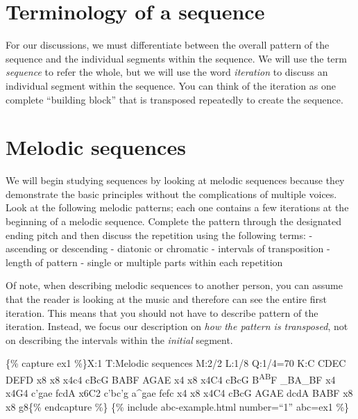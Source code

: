 \documentclass{book}
\begin{document}
\hypertarget{terminology-of-a-sequence}{%
\section{Terminology of a sequence}\label{terminology-of-a-sequence}}

For our discussions, we must differentiate between the overall pattern of the
sequence and the individual segments within the sequence. We will use the term
\emph{sequence} to refer the whole, but we will use the word \emph{iteration}
to discuss an individual segment within the sequence. You can think of the
iteration as one complete ``building block'' that is transposed repeatedly to
create the sequence.

\hypertarget{melodic-sequences}{%
\section{Melodic sequences}\label{melodic-sequences}}

We will begin studying sequences by looking at melodic sequences because they
demonstrate the basic principles without the complications of multiple voices.
Look at the following melodic patterns; each one contains a few iterations at
the beginning of a melodic sequence. Complete the pattern through the
designated ending pitch and then discuss the repetition using the following
terms: - ascending or descending - diatonic or chromatic - intervals of
transposition - length of pattern - single or multiple parts within each
repetition

Of note, when describing melodic sequences to another person, you can assume
that the reader is looking at the music and therefore can see the entire first
iteration. This means that you should not have to describe pattern of the
iteration. Instead, we focus our description on \emph{how the pattern is
transposed}, not on describing the intervals within the \emph{initial}
segment.

\{\% capture ex1 \%\}X:1 T:Melodic sequences M:2/2 L:1/8 Q:1/4=70 K:C CDEC
DEFD\textbar{} x8\textbar{} x8\textbar{} x4c4\textbar\textbar{} cBcG
BABF\textbar{} AGAE x4\textbar{} x8\textbar{} x4C4\textbar\textbar{} cBcG
B\textsuperscript{AB}F\textbar{} \_BA\_BF x4\textbar{} x4G4\textbar\textbar{}
c'gae fcdA\textbar{} x6C2\textbar\textbar{} c'bc'g a\^{}gae\textbar{} fefc
x4\textbar{} x8\textbar{} x4C4\textbar\textbar{} cBcG AGAE\textbar{} dcdA
BABF\textbar{} x8\textbar{} x8\textbar{} g8\textbar\textbar\{\% endcapture
\%\} \{\% include abc-example.html number=``1'' abc=ex1 \%\}
\end{document}
